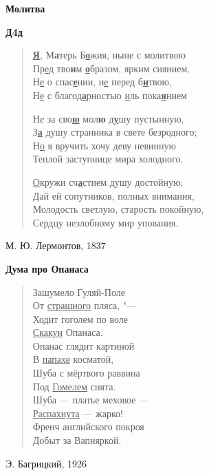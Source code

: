 \documentclass{beamer}
\begin{document}
\begin{frame}

\begin{center}
\textbf{Молитва}
\end{center}
\textbf{Д4д}
\begin{verse}
\underline{\textbf{Я}}, М\textbf{а}терь Б\underline{\textbf{о}}жия, ныне с молитвою\\
Пр\underline{е}д тво\textbf{и}м \underline{\textbf{о}}бразом, ярким сиянием,\\
Н\underline{е} о спас\underline{\textbf{е}}нии, н\underline{е} перед б\underline{\textbf{и}}твою,\\
Н\underline{е} с благод\underline{\textbf{а}}рностью \underline{и}ль пока\underline{\textbf{я}}нием

Н\textit{е} за сво\underline{\textbf{ю}} мол\textbf{ю} д\textbf{\underline{у}}шу пустынную,\\
З\underline{\textbf{а}} душу странника в свете безродного;\\
Н\underline{о} я вручить хочу деву невинную\\
Теплой заступнице мира холодного.

\underline{О}кружи сч\underline{\textbf{а}}стием душу достойную;\\
Дай ей сопутников, полных внимания,\\
Молодость светлую, старость покойную,\\
Сердцу незлобному мир упования.
\end{verse}

М. Ю. Лермонтов, 1837

\end{frame}


\begin{frame}

\begin{center}
\textbf{Дума про Опанаса}
\end{center}

\begin{verse}
Зашумело Гуляй-Поле\\
От \underline{страшного} пляса, "---\\
Ходит гоголем по воле\\
\underline{Скакун} Опанаса.\\
Опанас глядит картиной\\
В \underline{папахе} косматой,\\
Шуба с мёртвого раввина\\
Под \underline{Гомелем} снята.\\
Шуба — платье меховое — \\
\underline{Распахнута} — жарко! \\
Френч английского покроя \\
Добыт за Вапняркой. 
\end{verse}

Э. Багрицкий, 1926

\end{frame}
\end{document}
